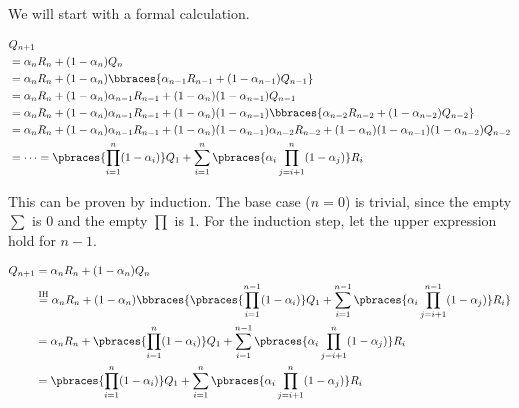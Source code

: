 \begin{solution}

We will start with a formal calculation.

\begin{align*}
    &
    Q_{n+1} \\
    & =
    \alpha_n R_n + (1 - \alpha_n) Q_n \\
    & =
    \alpha_n R_n + (1 - \alpha_n) \bbraces{\alpha_{n-1} R_{n-1} + (1 - \alpha_{n-1}) Q_{n-1}} \\
    & =
    \alpha_n R_n + (1 - \alpha_n) \alpha_{n-1} R_{n-1} + (1 - \alpha_n) (1 - \alpha_{n-1}) Q_{n-1} \\
    & =
    \alpha_n R_n + (1 - \alpha_n) \alpha_{n-1} R_{n-1} + (1 - \alpha_n) (1 - \alpha_{n-1}) \bbraces{\alpha_{n-2} R_{n-2} + (1 - \alpha_{n-2}) Q_{n-2}} \\
    & =
    \alpha_n R_n + (1 - \alpha_n) \alpha_{n-1} R_{n-1} + (1 - \alpha_n) (1 - \alpha_{n-1}) \alpha_{n-2} R_{n-2} + (1 - \alpha_n) (1 - \alpha_{n-1}) (1 - \alpha_{n-2}) Q_{n-2} \\
    & = \cdots =
    \pbraces
    {
        \prod_{i=1}^n
            (1 - \alpha_i)
    }
    Q_1
    +
    \sum_{i=1}^n
        \pbraces
        {
            \alpha_i
            \prod_{j=i+1}^n
                (1 - \alpha_j)
        }
        R_i
\end{align*}

This can be proven by induction.
The base case ($n = 0$) is trivial, since the empty $\sum$ is $0$ and the empty $\prod$ is $1$.
For the induction step, let the upper expression hold for $n-1$.

\begin{align*}
    Q_{n+1}
    & =
    \alpha_n R_n + (1 - \alpha_n) Q_n \\
    & \stackrel
    {
        \text{IH}
    }{=}
    \alpha_n R_n + (1 - \alpha_n)
    \bbraces
    {
        \pbraces
        {
            \prod_{i=1}^{n-1}
                (1 - \alpha_i)
        }
        Q_1
        +
        \sum_{i=1}^{n-1}
            \pbraces
            {
                \alpha_i
                \prod_{j=i+1}^{n-1}
                    (1 - \alpha_j)
            }
            R_i
    } \\
    & =
    \alpha_n R_n
    +
    \pbraces
    {
        \prod_{i=1}^n
            (1 - \alpha_i)
    }
    Q_1
    +
    \sum_{i=1}^{n-1}
        \pbraces
        {
            \alpha_i
            \prod_{j=i+1}^n
                (1 - \alpha_j)
        }
        R_i \\
    & =
    \pbraces
    {
        \prod_{i=1}^n
            (1 - \alpha_i)
    }
    Q_1
    +
    \sum_{i=1}^n
        \pbraces
        {
            \alpha_i
            \prod_{j=i+1}^n
                (1 - \alpha_j)
        }
        R_i
\end{align*}

\end{solution}

